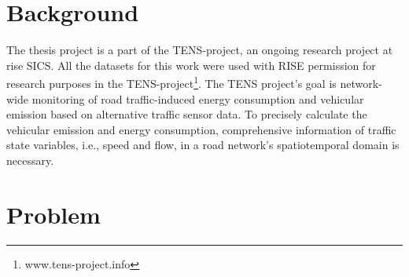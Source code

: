 \documentclass[english]{kththesis}
\begin{document}
\section{Background}
\label{sec:background}
\renewcommand{\thefootnote}{\arabic{footnote}}
The thesis project is a part of the TENS-project, an ongoing research project at \gls{rise} SICS. All the datasets for this work were used with RISE permission for research purposes in the TENS-project\footnote{www.tens-project.info}. The TENS project's goal is network-wide monitoring of road traffic-induced energy consumption and vehicular emission based on alternative traffic sensor data. To precisely calculate the vehicular emission and energy consumption, comprehensive information of traffic state variables, i.e., speed and flow, in a road network's spatiotemporal domain is necessary.

\section{Problem}
\end{document}
